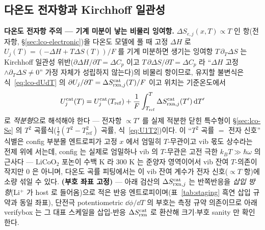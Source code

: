 \subsection{다온도 전자항과 Kirchhoff 일관성}\label{sec:lco-center-kirchhoff}
\textbf{다온도 전자항 주의 --- 기계 미분이 낳는 비물리 잉여항.} $\Delta S_{e,j}(x,T)\propto T$
인 항(전자항, \S\ref{sec:lco-electronic})을 다온도 모델에 풀 때 고정 $\Delta H$ 로 $U_j(T)=(-\Delta H+T\Delta S(T))/F$ 를 기계 미분하면 생기는
잉여항 $T\,\partial_T\Delta S$ 는 Kirchhoff 일관성 위반($\partial\Delta H/\partial T=\Delta C_p$ 이고
$T\,\partial\Delta S/\partial T=\Delta C_p$ 라 ``$\Delta H$ 고정$\wedge\partial_T\Delta S\ne0$'' 가정 자체가
성립하지 않는다)의 비물리 항이므로, 유지할 불변식은 식~\eqref{eq:lco-dUdT} 의
$\partial U_j/\partial T=\Delta S_{\mathrm{rxn},j}^\mathrm{cat}(T)/F$ 이고 위치는 기준온도에서
\begin{equation}
U_j^\mathrm{cat}(T)=U_j^\mathrm{cat}(T_\mathrm{ref})+\frac1F\int_{T_\mathrm{ref}}^{T}\Delta S_{\mathrm{rxn},j}^\mathrm{cat}(T')\,\mathrm{d} T'
\label{eq:lco-kirchhoff}
\end{equation}
로 \emph{적분형}으로 해석해야 한다 --- 전자항 $\propto T'$ 를 실제 적분한 닫힌 특수형이 \S\ref{sec:lco-Se} 의
$T^2$ 곡률식($\tfrac12(T^2-T_\mathrm{ref}^2)$ 곡률, 식~\eqref{eq:U1T2})이다. 이 ``$T^2$ 곡률 $=$ 전자 신호'' 식별은 config 부분몰 엔트로피가
고정 $x$ 에서 엄밀히 $T$-무관이고 vib 몫도 상수라는 전제 위에 서는데, config 는 실제로 엄밀하나 vib 의 $T$-무관은
고전 극한 $k_BT\gg\hbar\omega$ 의 근사다 --- $\mathrm{LiCoO_2}$ 포논이 수백 K 라 $300$ K 는 준양자 영역이어서 vib 잔여
$T$-의존이 작지만 $0$ 은 아니며, 다온도 곡률 피팅에서는 이 vib 잔여 계수가 전자 신호($\propto T$ 항)에 소량 섞일 수 있다.
\textbf{(부호 좌표 고정)} --- 아래 검산의 $\Delta S_{\mathrm{rxn},j}^\mathrm{cat}$ 는 반쪽반응을
\emph{삽입 방향}(Li$^+$ 가 host 로 들어옴)으로 적은 반응 엔트로피이며(표~\ref{tab:staging} 흑연 삽입 규약과
동일 좌표), 단전극 potentiometric $\dd\phi/\dd T$ 의 부호는 측정 규약 의존이므로 아래 verifybox 는 그
대표 스케일을 삽입-반응 $\Delta S_{\mathrm{rxn}}^\mathrm{cat}$ 로 환산해 크기$\cdot$부호 sanity 만 확인한다.

